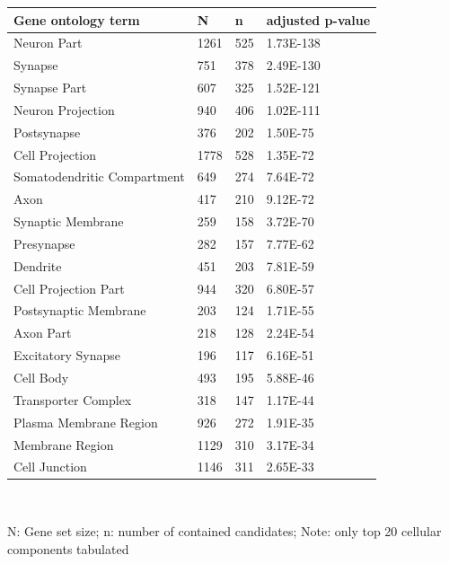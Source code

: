 \begin{refsection}
\begin{table}[H]
\small
{}\selectfont
{} \label{table3S9} 
\centering
\begin{tabular}{@{}llll@{}}
\hline
Gene ontology term          & N    & n   & adjusted p-value \\ \hline
Neuron Part                 & 1261 & 525 & 1.73E-138        \\
Synapse                     & 751  & 378 & 2.49E-130        \\
Synapse Part                & 607  & 325 & 1.52E-121        \\
Neuron Projection           & 940  & 406 & 1.02E-111        \\
Postsynapse                 & 376  & 202 & 1.50E-75         \\
Cell Projection             & 1778 & 528 & 1.35E-72         \\
Somatodendritic Compartment & 649  & 274 & 7.64E-72         \\
Axon                        & 417  & 210 & 9.12E-72         \\
Synaptic Membrane           & 259  & 158 & 3.72E-70         \\
Presynapse                  & 282  & 157 & 7.77E-62         \\
Dendrite                    & 451  & 203 & 7.81E-59         \\
Cell Projection Part        & 944  & 320 & 6.80E-57         \\
Postsynaptic Membrane       & 203  & 124 & 1.71E-55         \\
Axon Part                   & 218  & 128 & 2.24E-54         \\
Excitatory Synapse          & 196  & 117 & 6.16E-51         \\
Cell Body                   & 493  & 195 & 5.88E-46         \\
Transporter Complex         & 318  & 147 & 1.17E-44         \\
Plasma Membrane Region      & 926  & 272 & 1.91E-35         \\
Membrane Region             & 1129 & 310 & 3.17E-34         \\
Cell Junction               & 1146 & 311 & 2.65E-33         \\ \hline
\end{tabular}\\
{\begin{flushleft}
\scriptsize N: Gene set size; n: number of contained candidates; Note: only top 20 cellular components tabulated
\end{flushleft}}
\end{table}



\end{refsection}
